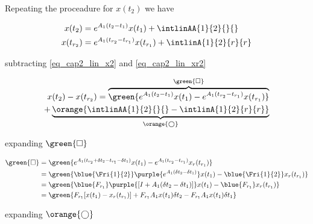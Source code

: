 Repeating the proceadure for $x(t_2)$ we have

\begin{align}
	\label{eq_cap2_lin_x2}
	x(t_2)  &= e^{A_1(t_2-t_1)}x(t_1) + \intlinAA{1}{2}{}{} \\
	\label{eq_cap2_lin_xr2}
	x(t_{r_2}) &= e^{A_1(t_{r_2}-t_{r_1})}x(t_{r_1}) + \intlinA{1}{2}{r}{r}
\end{align}

subtracting \ref{eq_cap2_lin_x2} and \ref{eq_cap2_lin_xr2} 

\begin{equation}
	\label{eq_cap2_lin_erro_x1x2}
	\begin{split}
		x(t_2) - x(t_{r_2}) = 
		\overbrace{\green{e^{A_1(t_2-t_1)}x(t_1) - e^{A_1(t_{r_2}-t_{r_1})}x(t_{r_1})}}^{\green{\square}} \\ 
		+ \underbrace{\orange{\intlinAA{1}{2}{}{} - \intlinA{1}{2}{r}{r}}}_{\orange{\bigcirc}}
	\end{split}
\end{equation}

expanding $\green{\square}$

\begin{align}
	\green{ \square } &=
	\green{
		e^{A_1(t_{r_2} + \delta t_2 - t_{r_1} - \delta t_1)} x(t_1)
		- e^{A_1(t_{r_2} - t_{r_1})} x_r(t_{r_1})
	} \nonumber \\
	&= \green{
		\blue{\Fri{1}{2}} \purple{e^{A_1(\delta t_2 - \delta t_1)}} x(t_1)
		- \blue{\Fri{1}{2}} x_r(t_{r_1})
	} \nonumber \\
	&= \green{
		\blue{F_{r_1}} \purple{[I + A_1(\delta t_2 - \delta t_1)]} x(t_1)
		- \blue{F_{r_1}} x_r(t_{r_1})
	} \nonumber \\
	\label{eq_cap2_lin_x2_green}
	&= \green{
		F_{r_1} [x(t_1) - x_r(t_{r_1})] + F_{r_1} A_1 x(t_1) \delta t_2
		- F_{r_1} A_1 x(t_1) \delta t_1
	}
\end{align}

expanding $\orange{\bigcirc}$

